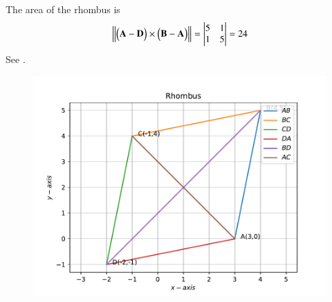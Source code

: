 The area of the rhombus is
\begin{align}
                \left\lVert\begin{pmatrix}\mathbf{A-D}\end{pmatrix}\times \begin{pmatrix}\mathbf{B-A}\end{pmatrix}\right\rVert=\begin{vmatrix}5 & 1\\1 & 5\end{vmatrix} = 24
\end{align}
See 
.
\begin{figure}[!h]
 \begin{center}
  \includegraphics[width=\columnwidth]{chapters/10/7/2/10/figs/fig.pdf}
 \end{center}
\caption{}
\label{fig:chapters/10/7/2/10/gFig1}
\end{figure}
